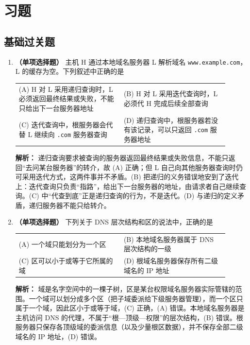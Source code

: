 \section{习题}

\subsection{基础过关题}

\begin{enumerate}

\item \textbf{（单项选择题）} 主机 H 通过本地域名服务器 L 解析域名 \texttt{www.example.com}，L 的缓存为空。下列叙述中正确的是
\begin{center}
\begin{tabular}{>{\raggedright\arraybackslash}p{0.45\linewidth}>{\raggedright\arraybackslash}p{0.45\linewidth}}
(A) H 对 L 采用递归查询时，L 必须返回最终结果或失败，不能只给出下一台服务器地址 &
(B) H 对 L 采用迭代查询时，L 必须代 H 完成后续全部查询 \\[6pt]
(C) 迭代查询中，根服务器会代替 L 继续向 \texttt{.com} 服务器查询 &
(D) 递归查询中，根服务器若没有该记录，可以只返回 \texttt{.com} 服务器地址
\end{tabular}
\end{center}

\ifshowsolutions\par\noindent\textbf{解析：} 递归查询要求被查询的服务器返回最终结果或失败信息，不能只返回“去问某台服务器”的转介，故 (A) 正确；但 L 自己向其他服务器查询时仍可采用迭代方式，这两件事并不矛盾。(B) 把递归的义务错误地安到了迭代上：迭代查询只负责“指路”，给出下一台服务器的地址，由请求者自己继续查询。(C) 中“代查到底”正是递归查询的行为，不是迭代。(D) 与递归的定义矛盾，递归服务器不能只给转介。\else \answerarea \fi

\item \textbf{（单项选择题）} 下列关于 DNS 层次结构和区的说法中，正确的是
\begin{center}
\begin{tabular}{>{\raggedright\arraybackslash}p{0.45\linewidth}>{\raggedright\arraybackslash}p{0.45\linewidth}}
(A) 一个域只能划分为一个区 &
(B) 本地域名服务器属于 DNS 层次结构的一级 \\[6pt]
(C) 区可以小于或等于它所属的域 &
(D) 根域名服务器保存所有二级域名的 IP 地址
\end{tabular}
\end{center}

\ifshowsolutions\par\noindent\textbf{解析：} 域是名字空间中的一棵子树，区是某台权限域名服务器实际管辖的范围。一个域可以划分成多个区（把子域委派给下级服务器管理），而一个区只属于一个域，因此区小于或等于域，(C) 正确，(A) 错误。本地域名服务器是主机访问 DNS 的代理，不属于“根—顶级—权限”的层次结构，(B) 错误。根服务器只保存各顶级域的委派信息（以及少量根区数据），并不保存全部二级域名的 IP 地址，(D) 错误。\else \answerarea \fi


\end{enumerate}

